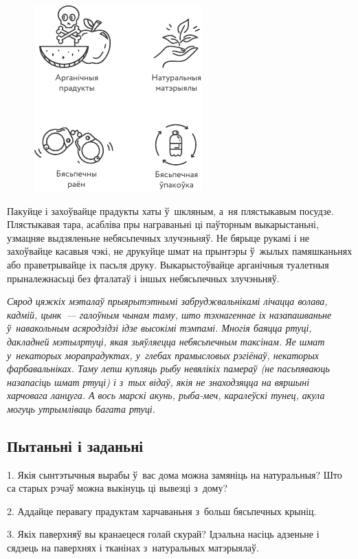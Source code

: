 \begin{figure}[htb!]
  \centering
  \includegraphics[scale=1.5]{willpower/ch11/13.pdf}
\end{figure}

Пакуйце і захоўвайце прадукты хаты ў~шкляным, а~ня плястыкавым посудзе. Плястыкавая тара, асабліва пры награваньні ці паўторным выкарыстаньні, узмацняе выдзяленьне небясьпечных злучэньняў. Не бярыце рукамі і не захоўвайце касавыя чэкі, не друкуйце шмат на прынтэры ў~жылых памяшканьнях або праветрывайце іх пасьля друку. Выкарыстоўвайце арганічныя туалетныя прыналежнасьці без фталатаў і іншых небясьпечных злучэньняў.

\emph{Сярод цяжкіх мэталаў прыярытэтнымі забруджвальнікамі лічацца волава, кадмій, цынк~--- галоўным чынам таму, што тэхнагеннае іх назапашваньне ў~навакольным асяродзідзі ідзе высокімі тэмпамі. Многія баяцца ртуці, дакладней мэтылртуці, якая зьяўляецца небясьпечным таксінам. Яе шмат у~некаторых морапрадуктах, у~глебах прамысловых рэгіёнаў, некаторых фарбавальніках. Таму лепш купляць рыбу невялікіх памераў (не пасьпяваюць назапасіць шмат ртуці) і з~тых відаў, якія не знаходзяцца на вяршыні харчовага ланцуга. А вось марскі акунь, рыба-меч, каралеўскі тунец, акула могуць утрымліваць багата ртуці.}

\subsection*{Пытаньні і заданьні}

1. Якія сынтэтычныя вырабы ў~вас дома можна замяніць на натуральныя? Што са старых рэчаў можна выкінуць ці вывезці з~дому?

2. Аддайце перавагу прадуктам харчаваньня з~больш бясьпечных крыніц.

3. Якіх паверхняў вы кранаецеся голай скурай? Ідэальна насіць адзеньне і сядзець на паверхнях і тканінах з~натуральных матэрыялаў.


